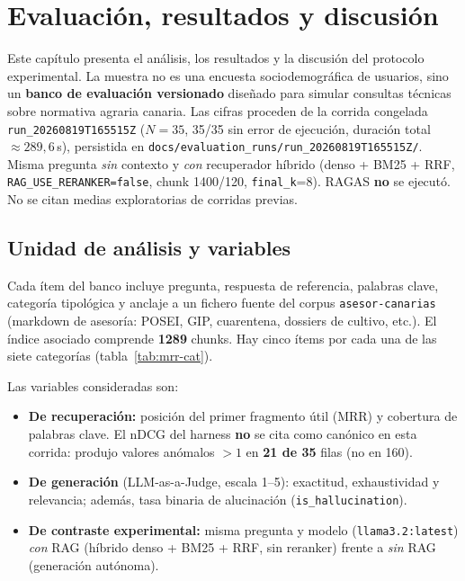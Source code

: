 \chapter{Evaluación, resultados y discusión}
\label{ch:evaluacion}

Este capítulo presenta el análisis, los resultados y la discusión del protocolo experimental. La muestra no es una encuesta sociodemográfica de usuarios, sino un \textbf{banco de evaluación versionado} diseñado para simular consultas técnicas sobre normativa agraria canaria. Las cifras proceden de la corrida congelada \texttt{run\_20260819T165515Z} ($N=35$, 35/35 sin error de ejecución, duración total $\approx 289{,}6$\,s), persistida en \texttt{docs/evaluation\_runs/run\_20260819T165515Z/}. Misma pregunta \emph{sin} contexto y \emph{con} recuperador híbrido (denso + BM25 + RRF, \texttt{RAG\_USE\_RERANKER=false}, chunk 1400/120, \texttt{final\_k}=8). RAGAS \textbf{no} se ejecutó. No se citan medias exploratorias de corridas previas.

\section{Unidad de análisis y variables}
Cada ítem del banco incluye pregunta, respuesta de referencia, palabras clave, categoría tipológica y anclaje a un fichero fuente del corpus \texttt{asesor-canarias} (markdown de asesoría: POSEI, GIP, cuarentena, dossiers de cultivo, etc.). El índice asociado comprende \textbf{1289} chunks. Hay cinco ítems por cada una de las siete categorías (tabla~\ref{tab:mrr-cat}).

Las variables consideradas son:

\begin{itemize}
  \item \textbf{De recuperación:} posición del primer fragmento útil (MRR) y cobertura de palabras clave. El nDCG del harness \textbf{no} se cita como canónico en esta corrida: produjo valores anómalos $>1$ en \textbf{21 de 35} filas (no en 160).
  \item \textbf{De generación} (LLM-as-a-Judge, escala 1--5): exactitud, exhaustividad y relevancia; además, tasa binaria de alucinación (\texttt{is\_hallucination}).
  \item \textbf{De contraste experimental:} misma pregunta y modelo (\texttt{llama3.2:latest}) \emph{con} RAG (híbrido denso + BM25 + RRF, sin reranker) frente a \emph{sin} RAG (generación autónoma).
\end{itemize}

